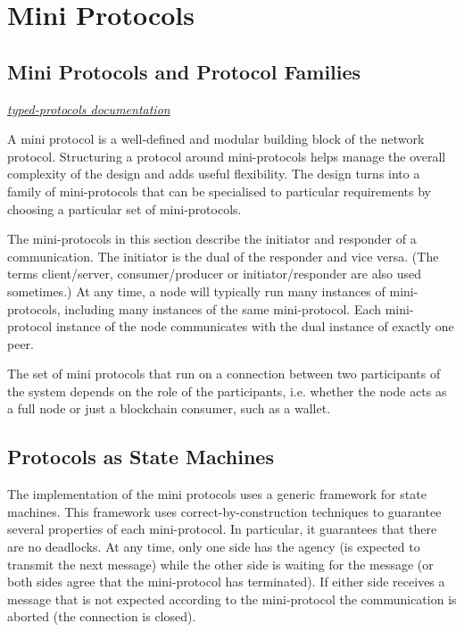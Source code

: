 \chapter{Mini Protocols}
\label{chapter:mini-protocols}

\newcommand{\Client}{\textcolor{mygreen}{\textbf{Client}}}
\newcommand{\Server}{\textcolor{myblue}{\textbf{Server}}}

\section{Mini Protocols and Protocol Families}
\noindent\href{https://hackage.haskell.org/package/typed-protocols}{\emph{typed-protocols documentation}}

A mini protocol is a well-defined and modular building block of
the network protocol.
Structuring a protocol around mini-protocols helps manage the overall complexity of
the design and adds useful flexibility.
The design turns into a family of mini-protocols that can be specialised to particular requirements
by choosing a particular set of mini-protocols.

The mini-protocols in this section describe the initiator and responder of a communication.
The initiator is the dual of the responder and vice versa.
(The terms client/server, consumer/producer or initiator/responder are also used sometimes.)
At any time, a node will typically run many instances of mini-protocols, including many instances of the
same mini-protocol.
Each mini-protocol instance of the node communicates with the dual instance of
exactly one peer.

The set of mini protocols that run on a connection between two participants of the system
depends on the role of the participants, i.e. whether the node acts as a full node or just
a blockchain consumer, such as a wallet.

\section{Protocols as State Machines}
The implementation of the mini protocols uses a generic framework for state machines.
This framework uses correct-by-construction techniques to guarantee
several properties of each mini-protocol.
In particular, it guarantees that there are no deadlocks.
At any time, only one side has the agency
(is expected to transmit the next message) while the other side is waiting for
the message (or both sides agree that the mini-protocol has terminated).
If either side receives a message that is not expected according to the mini-protocol
the communication is aborted (the connection is closed).

